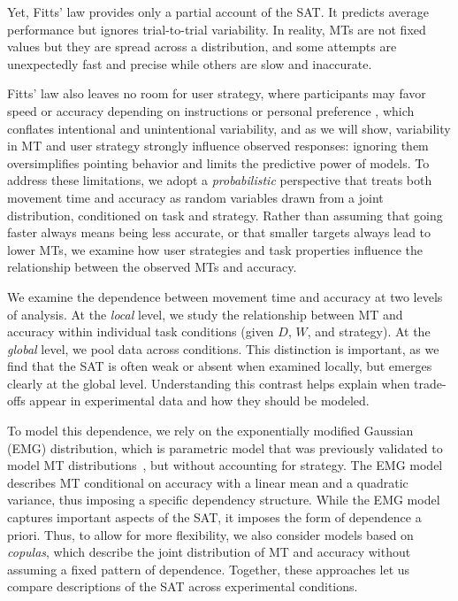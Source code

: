 \documentclass[acmlarge, manuscript,review]{acmart}
\begin{document}
Yet, Fitts' law provides only a partial account of the SAT. It predicts average performance but ignores trial-to-trial variability. In reality, MTs are not fixed values but they are spread across a distribution, and some attempts are unexpectedly fast and precise while others are slow and inaccurate. 



Fitts' law also leaves no room for user strategy, where participants may favor speed or accuracy depending on instructions or personal preference \cite{zhai2004nominal,guiard2015}, which conflates intentional and unintentional variability, and as we will show, variability in MT and user strategy strongly influence observed responses: ignoring them oversimplifies pointing behavior and limits the predictive power of models.
To address these limitations, we adopt a \textit{probabilistic} perspective that treats both movement time and accuracy as random variables drawn from a joint distribution, conditioned on task and strategy.
Rather than assuming that going faster always means being less accurate, or that smaller targets always lead to lower MTs, we examine how user strategies and task properties influence the relationship between the observed MTs and accuracy.


We examine the dependence between movement time and accuracy at two levels of analysis.  At the \emph{local} level, we study the relationship between MT and accuracy within individual task conditions (given $D$, $W$, and strategy). 
At the \emph{global} level, we pool data across conditions. 
This distinction is important, as we find that the SAT is often weak or absent when examined locally, but emerges clearly at the global level. 
Understanding this contrast helps explain when trade-offs appear in experimental data and how they should be modeled.


To model this dependence, we rely on the exponentially modified Gaussian (EMG) distribution, which is parametric model that was previously validated to model MT distributions~\cite{gori2019,gori2018these,li2024,zhao2022}, but without accounting for strategy. 
The EMG model describes MT conditional on accuracy with a linear mean and a quadratic variance, thus imposing a specific dependency structure. 
While the EMG model captures important aspects of the SAT, it imposes the form of dependence a priori.
Thus, to allow for more flexibility, we also consider models based on \emph{copulas}, which describe the joint distribution of MT and accuracy without assuming a fixed pattern of dependence. 
Together, these approaches let us compare descriptions of the SAT across experimental conditions.
\end{document}
